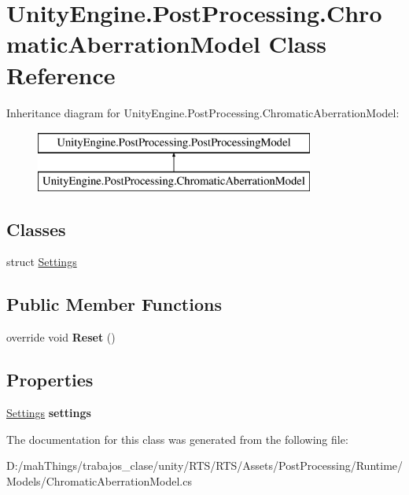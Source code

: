 \hypertarget{class_unity_engine_1_1_post_processing_1_1_chromatic_aberration_model}{}\section{Unity\+Engine.\+Post\+Processing.\+Chromatic\+Aberration\+Model Class Reference}
\label{class_unity_engine_1_1_post_processing_1_1_chromatic_aberration_model}
Inheritance diagram for Unity\+Engine.\+Post\+Processing.\+Chromatic\+Aberration\+Model\+:\begin{figure}[H]
\begin{center}
\leavevmode
\includegraphics[height=2.000000cm]{class_unity_engine_1_1_post_processing_1_1_chromatic_aberration_model}
\end{center}
\end{figure}
\subsection*{Classes}
\begin{DoxyCompactItemize}
\item 
struct \mbox{\hyperlink{struct_unity_engine_1_1_post_processing_1_1_chromatic_aberration_model_1_1_settings}{Settings}}
\end{DoxyCompactItemize}
\subsection*{Public Member Functions}
\begin{DoxyCompactItemize}
\item 
\mbox{\label{class_unity_engine_1_1_post_processing_1_1_chromatic_aberration_model_a10912d80b3a86b38f88a0bfee52ff948}} 
override void {\bfseries Reset} ()
\end{DoxyCompactItemize}
\subsection*{Properties}
\begin{DoxyCompactItemize}
\item 
\mbox{\label{class_unity_engine_1_1_post_processing_1_1_chromatic_aberration_model_ae3d8ac283bcf4f8c8d115b0f026d0da2}} 
\mbox{\hyperlink{struct_unity_engine_1_1_post_processing_1_1_chromatic_aberration_model_1_1_settings}{Settings}} {\bfseries settings}
\end{DoxyCompactItemize}


The documentation for this class was generated from the following file\+:\begin{DoxyCompactItemize}
\item 
D\+:/mah\+Things/trabajos\+\_\+clase/unity/\+R\+T\+S/\+R\+T\+S/\+Assets/\+Post\+Processing/\+Runtime/\+Models/Chromatic\+Aberration\+Model.\+cs\end{DoxyCompactItemize}
